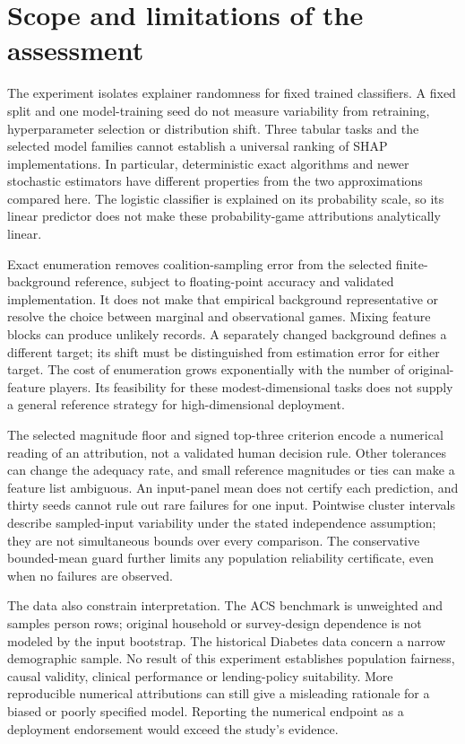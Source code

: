 \section{Scope and limitations of the assessment}
\label{sec:scope}

The experiment isolates explainer randomness for fixed trained classifiers. A fixed split and one model-training seed do not measure variability from retraining, hyperparameter selection or distribution shift. Three tabular tasks and the selected model families cannot establish a universal ranking of SHAP implementations. In particular, deterministic exact algorithms and newer stochastic estimators have different properties from the two approximations compared here. The logistic classifier is explained on its probability scale, so its linear predictor does not make these probability-game attributions analytically linear.

Exact enumeration removes coalition-sampling error from the selected finite-background reference, subject to floating-point accuracy and validated implementation. It does not make that empirical background representative or resolve the choice between marginal and observational games. Mixing feature blocks can produce unlikely records. A separately changed background defines a different target; its shift must be distinguished from estimation error for either target. The cost of enumeration grows exponentially with the number of original-feature players. Its feasibility for these modest-dimensional tasks does not supply a general reference strategy for high-dimensional deployment.

The selected magnitude floor and signed top-three criterion encode a numerical reading of an attribution, not a validated human decision rule. Other tolerances can change the adequacy rate, and small reference magnitudes or ties can make a feature list ambiguous. An input-panel mean does not certify each prediction, and thirty seeds cannot rule out rare failures for one input. Pointwise cluster intervals describe sampled-input variability under the stated independence assumption; they are not simultaneous bounds over every comparison. The conservative bounded-mean guard further limits any population reliability certificate, even when no failures are observed.

The data also constrain interpretation. The ACS benchmark is unweighted and samples person rows; original household or survey-design dependence is not modeled by the input bootstrap. The historical Diabetes data concern a narrow demographic sample. No result of this experiment establishes population fairness, causal validity, clinical performance or lending-policy suitability. More reproducible numerical attributions can still give a misleading rationale for a biased or poorly specified model. Reporting the numerical endpoint as a deployment endorsement would exceed the study's evidence.
